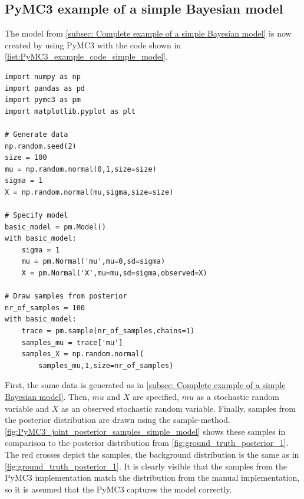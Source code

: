 \documentclass{article}
\begin{document}
\subsection{PyMC3 example of a simple Bayesian model}
\label{subsec: PyMC3 example of a simple Bayesian model}
The model from \autoref{subsec: Complete example of a simple Bayesian model} is now created by using PyMC3 with the code shown in \autoref{list:PyMC3_example_code_simple_model}.\\
\begin{minipage}{\linewidth}
\begin{lstlisting}[caption={Code used to specify the example model in PyMC3}, label={list:PyMC3_example_code_simple_model},captionpos=b]
import numpy as np
import pandas as pd
import pymc3 as pm
import matplotlib.pyplot as plt
	
# Generate data
np.random.seed(2)
size = 100
mu = np.random.normal(0,1,size=size)
sigma = 1
X = np.random.normal(mu,sigma,size=size)
	
# Specify model
basic_model = pm.Model()
with basic_model:
    sigma = 1
    mu = pm.Normal('mu',mu=0,sd=sigma)
    X = pm.Normal('X',mu=mu,sd=sigma,observed=X)

# Draw samples from posterior
nr_of_samples = 100
with basic_model:
    trace = pm.sample(nr_of_samples,chains=1)
    samples_mu = trace['mu']
    samples_X = np.random.normal(
        samples_mu,1,size=nr_of_samples)
\end{lstlisting}
\end{minipage}
First, the same data is generated as in \autoref{subsec: Complete example of a simple Bayesian model}. Then, $mu$ and $X$ are specified, $mu$ as a stochastic random variable and $X$ as an observed stochastic random variable. Finally, samples from the posterior distribution are drawn using the sample-method. 
\autoref{fig:PyMC3_joint_posterior_samples_simple_model} shows these samples in comparison to the posterior distribution from \autoref{fig:ground_truth_posterior_1}. The red crosses depict the samples, the background distribution is the same as in \autoref{fig:ground_truth_posterior_1}. It is clearly visible that the samples from the PyMC3 implementation match the distribution from the manual implementation, so it is assumed that the PyMC3 captures the model correctly.
\end{document}
